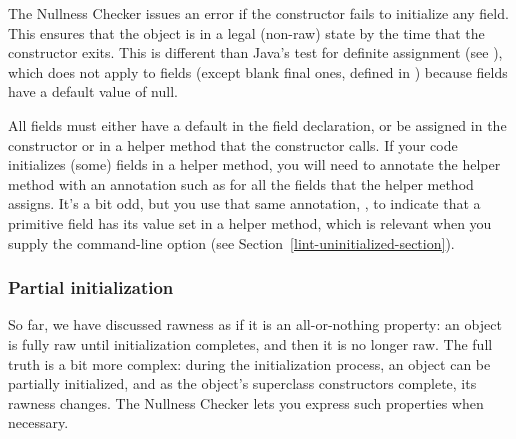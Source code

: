 The Nullness Checker issues an error if the constructor fails to initialize
any  field.  This ensures that the object is in a legal (non-raw)
state by the time that the constructor exits.
This is different than Java's test for definite assignment (see
),
which does not apply to fields (except blank final ones, defined in
) because fields
have a default value of null.



All  fields must either have a
default in the field declaration, or be assigned in the constructor or in a
helper method that the constructor calls.  If
your code initializes (some) fields in a helper method, you will need to
annotate the helper method with an annotation such as
for all the fields that the helper method assigns.
It's a bit odd, but you use that same annotation, ,
to indicate that a primitive field has its value set in a helper method,
which is relevant when you supply the 
command-line option (see Section~\ref{lint-uninitialized-section}).



\subsubsection{Partial initialization\label{rawness-partial-initialization}}

So far, we have discussed rawness as if it is an all-or-nothing property:
an object is fully raw until initialization completes, and then it is no
longer raw.  The full truth is a bit more complex:  during the
initialization process, an object can be partially initialized, and as the
object's superclass constructors complete, its rawness changes.  The
Nullness Checker lets you express such properties when necessary.

